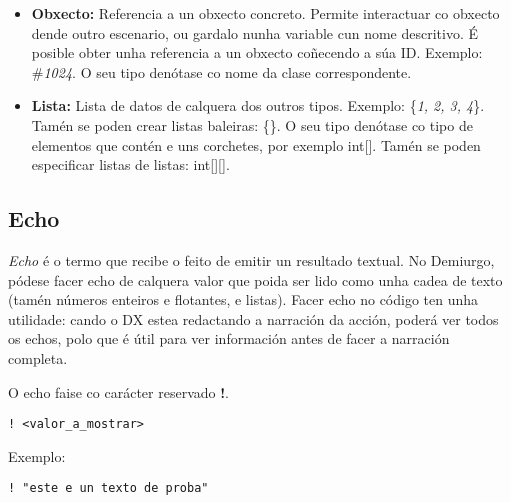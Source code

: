 \begin{itemize}
  \item {\bf Obxecto:} Referencia a un obxecto concreto. Permite interactuar co
  obxecto dende outro escenario, ou gardalo nunha variable cun nome descritivo.
  É posible obter unha referencia a un obxecto coñecendo a súa ID. Exemplo:
  \#{\it 1024}. O seu tipo
  denótase co nome da clase correspondente.
  \item {\bf Lista:} Lista de datos de calquera dos outros tipos. Exemplo:
  \{{\it 1, 2, 3, 4}\}. Tamén se poden crear listas baleiras: \{\}. O seu tipo
  denótase co tipo de elementos que contén e uns corchetes, por exemplo int[].
  Tamén se poden especificar listas de listas: int[][].
\end{itemize}


\subsection{Echo}
\label{sec:echo}
{\it Echo} é o termo que recibe o feito de emitir un resultado textual. No
Demiurgo, pódese facer echo de calquera valor que poida ser lido como unha cadea
de texto (tamén números enteiros e flotantes, e listas). Facer echo no código
ten unha utilidade: cando o DX estea redactando a narración da acción, poderá
ver todos os echos, polo que é útil para ver información antes de facer a
narración completa.
\par O echo faise co carácter reservado {\bf !}.
\begin{lstlisting}
! <valor_a_mostrar>
\end{lstlisting}
\par Exemplo:
\begin{lstlisting}
! "este e un texto de proba"
\end{lstlisting}

